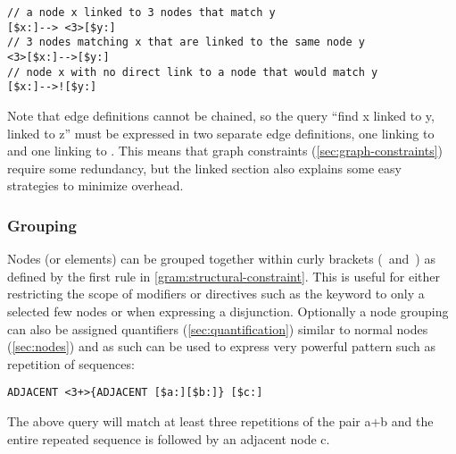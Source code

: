 \documentclass[11pt,a4paper]{report}
\begin{document}
\begin{Verbatim}[samepage=true]
// a node x linked to 3 nodes that match y
[$x:]--> <3>[$y:]
// 3 nodes matching x that are linked to the same node y   
<3>[$x:]-->[$y:]
// node x with no direct link to a node that would match y
[$x:]-->![$y:]
\end{Verbatim}

Note that edge definitions cannot be chained, so the query ``find x linked to y, linked to z'' must be expressed in two separate edge definitions, one linking  to  and one linking  to .
This means that graph constraints (\ref{sec:graph-constraints}) require some redundancy, but the linked section also explains some easy strategies to minimize overhead.

\subsubsection{Grouping}
\label{sec:node-grouping}
Nodes (or elements) can be grouped together within curly brackets (\lit{\{}~and~\lit{\}}) as defined by the first  rule in \cref{gram:structural-constraint}.
This is useful for either restricting the scope of modifiers or directives such as the  keyword to only a selected few nodes or when expressing a disjunction.
Optionally a node grouping can also be assigned quantifiers (\ref{sec:quantification}) similar to normal nodes (\ref{sec:nodes}) and as such can be used to express very powerful pattern such as repetition of sequences:
\begin{Verbatim}[samepage=true]
ADJACENT <3+>{ADJACENT [$a:][$b:]} [$c:]
\end{Verbatim}
The above query will match at least three repetitions of the pair a+b and the entire repeated sequence is followed by an adjacent node c.
\end{document}
